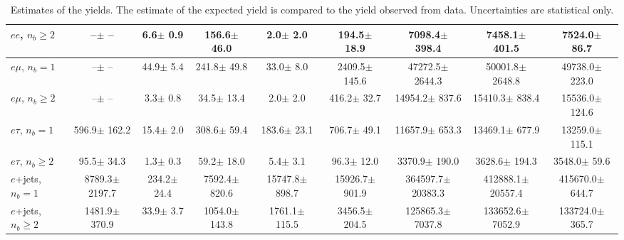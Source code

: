 \begin{sidewaystable}[p]
\begin{tabular}{l|cccccc|cc}
    $e e$, $n_b\geq2$                  &       --$\pm$     -- &      6.6$\pm$    0.9 &    156.6$\pm$   46.0 &      2.0$\pm$    2.0 &    194.5$\pm$   18.9 &   7098.4$\pm$  398.4 &   7458.1$\pm$  401.5 &   7524.0$\pm$   86.7 \\ 
    \hline
    $e\mu$, $n_b=1$                    &       --$\pm$     -- &     44.9$\pm$    5.4 &    241.8$\pm$   49.8 &     33.0$\pm$    8.0 &   2409.5$\pm$  145.6 &  47272.5$\pm$ 2644.3 &  50001.8$\pm$ 2648.8 &  49738.0$\pm$  223.0 \\ 
    $e\mu$, $n_b\geq2$                 &       --$\pm$     -- &      3.3$\pm$    0.8 &     34.5$\pm$   13.4 &      2.0$\pm$    2.0 &    416.2$\pm$   32.7 &  14954.2$\pm$  837.6 &  15410.3$\pm$  838.4 &  15536.0$\pm$  124.6 \\ 
    \hline
    $e\tau$, $n_b=1$                   &    596.9$\pm$  162.2 &     15.4$\pm$    2.0 &    308.6$\pm$   59.4 &    183.6$\pm$   23.1 &    706.7$\pm$   49.1 &  11657.9$\pm$  653.3 &  13469.1$\pm$  677.9 &  13259.0$\pm$  115.1 \\ 
    $e\tau$, $n_b\geq2$                &     95.5$\pm$   34.3 &      1.3$\pm$    0.3 &     59.2$\pm$   18.0 &      5.4$\pm$    3.1 &     96.3$\pm$   12.0 &   3370.9$\pm$  190.0 &   3628.6$\pm$  194.3 &   3548.0$\pm$   59.6 \\ 
    \hline
    $e$+jets, $n_b=1$                  &   8789.3$\pm$ 2197.7 &    234.2$\pm$   24.4 &   7592.4$\pm$  820.6 &  15747.8$\pm$  898.7 &  15926.7$\pm$  901.9 & 364597.7$\pm$20383.3 & 412888.1$\pm$20557.4 & 415670.0$\pm$  644.7 \\ 
    $e$+jets, $n_b\geq2$               &   1481.9$\pm$  370.9 &     33.9$\pm$    3.7 &   1054.0$\pm$  143.8 &   1761.1$\pm$  115.5 &   3456.5$\pm$  204.5 & 125865.3$\pm$ 7037.8 & 133652.6$\pm$ 7052.9 & 133724.0$\pm$  365.7 \\ 
    \hline

    \end{tabular}
    \caption{Estimates of the yields. The estimate of the expected yield is compared to
    the yield observed from data.  Uncertainties are statistical only.
    \label{tab:yields}}
\end{sidewaystable}
